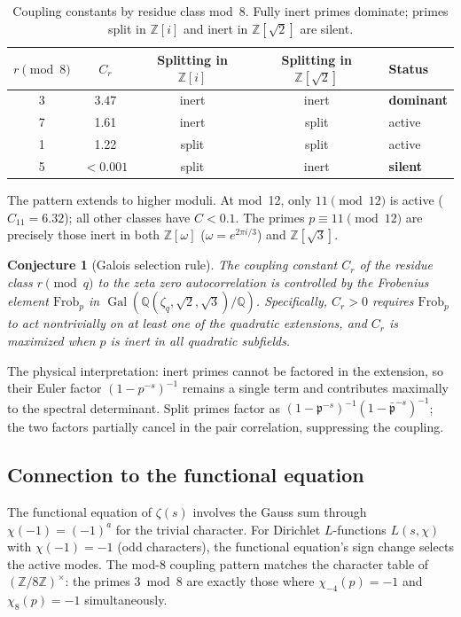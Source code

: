 \documentclass[11pt,a4paper]{article}
\newtheorem{conjecture}[theorem]{Conjecture}
\DeclareMathOperator{\Gal}{Gal}
\begin{document}
\begin{table}[ht]
\centering
\begin{tabular}{@{}ccccl@{}}
\toprule
$r \pmod{8}$ & $C_r$ & Splitting in $\mathbb{Z}[i]$ & Splitting in $\mathbb{Z}[\sqrt{2}]$ & Status \\
\midrule
3 & $\mathbf{3.47}$ & inert & inert & \textbf{dominant} \\
7 & 1.61 & inert & split & active \\
1 & 1.22 & split & split & active \\
5 & $< 0.001$ & split & inert & \textbf{silent} \\
\bottomrule
\end{tabular}
\caption{Coupling constants by residue class mod~8. Fully inert primes dominate; primes split in $\mathbb{Z}[i]$ and inert in $\mathbb{Z}[\sqrt{2}]$ are silent.}
\label{tab:modes}
\end{table}

The pattern extends to higher moduli.
At mod~12, only $11 \pmod{12}$ is active ($C_{11} = 6.32$); all other classes have $C < 0.1$.
The primes $p \equiv 11 \pmod{12}$ are precisely those inert in both $\mathbb{Z}[\omega]$ ($\omega = e^{2\pi i/3}$) and $\mathbb{Z}[\sqrt{3}]$.

\begin{conjecture}[Galois selection rule]\label{conj:galois}
The coupling constant $C_r$ of the residue class $r \pmod{q}$ to the zeta zero autocorrelation is controlled by the Frobenius element $\mathrm{Frob}_p$ in $\Gal(\mathbb{Q}(\zeta_q, \sqrt{2}, \sqrt{3})/\mathbb{Q})$.
Specifically, $C_r > 0$ requires $\mathrm{Frob}_p$ to act nontrivially on at least one of the quadratic extensions, and $C_r$ is maximized when $p$ is inert in all quadratic subfields.
\end{conjecture}

The physical interpretation: inert primes cannot be factored in the extension, so their Euler factor $(1 - p^{-s})^{-1}$ remains a single term and contributes maximally to the spectral determinant.
Split primes factor as $(1 - \mathfrak{p}^{-s})^{-1}(1 - \bar{\mathfrak{p}}^{-s})^{-1}$; the two factors partially cancel in the pair correlation, suppressing the coupling.

\subsection{Connection to the functional equation}

The functional equation of $\zeta(s)$ involves the Gauss sum through $\chi(-1) = (-1)^a$ for the trivial character.
For Dirichlet $L$-functions $L(s,\chi)$ with $\chi(-1) = -1$ (odd characters), the functional equation's sign change selects the active modes.
The mod-8 coupling pattern matches the character table of $(\mathbb{Z}/8\mathbb{Z})^\times$: the primes $3 \bmod 8$ are exactly those where $\chi_{-4}(p) = -1$ and $\chi_8(p) = -1$ simultaneously.
\end{document}
